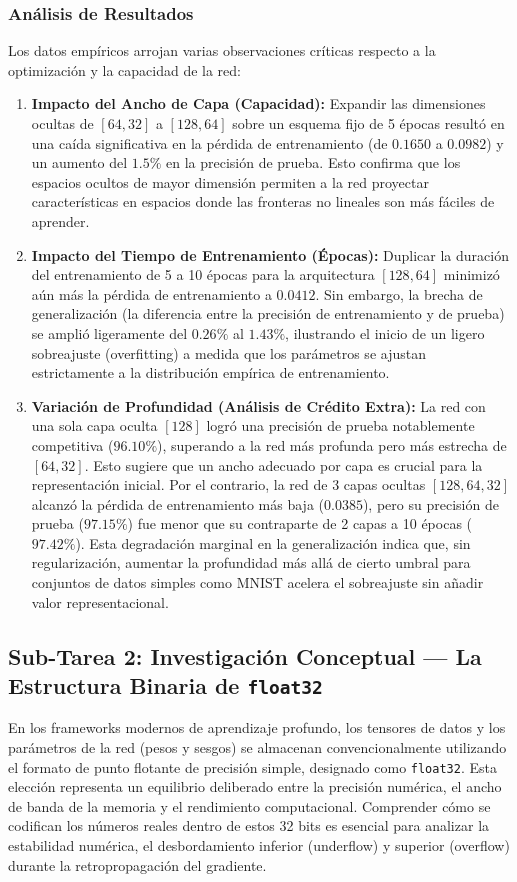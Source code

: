 \documentclass[12pt]{article}
\begin{document}
\subsubsection*{Análisis de Resultados}
Los datos empíricos arrojan varias observaciones críticas respecto a la optimización y la capacidad de la red:
\begin{enumerate}
    \item \textbf{Impacto del Ancho de Capa (Capacidad):} Expandir las dimensiones ocultas de $[64, 32]$ a $[128, 64]$ sobre un esquema fijo de 5 épocas resultó en una caída significativa en la pérdida de entrenamiento (de $0.1650$ a $0.0982$) y un aumento del $1.5\%$ en la precisión de prueba. Esto confirma que los espacios ocultos de mayor dimensión permiten a la red proyectar características en espacios donde las fronteras no lineales son más fáciles de aprender.
    \item \textbf{Impacto del Tiempo de Entrenamiento (Épocas):} Duplicar la duración del entrenamiento de 5 a 10 épocas para la arquitectura $[128, 64]$ minimizó aún más la pérdida de entrenamiento a $0.0412$. Sin embargo, la brecha de generalización (la diferencia entre la precisión de entrenamiento y de prueba) se amplió ligeramente del $0.26\%$ al $1.43\%$, ilustrando el inicio de un ligero sobreajuste (overfitting) a medida que los parámetros se ajustan estrictamente a la distribución empírica de entrenamiento.
    \item \textbf{Variación de Profundidad (Análisis de Crédito Extra):} La red con una sola capa oculta $[128]$ logró una precisión de prueba notablemente competitiva ($96.10\%$), superando a la red más profunda pero más estrecha de $[64, 32]$. Esto sugiere que un ancho adecuado por capa es crucial para la representación inicial. Por el contrario, la red de 3 capas ocultas $[128, 64, 32]$ alcanzó la pérdida de entrenamiento más baja ($0.0385$), pero su precisión de prueba ($97.15\%$) fue menor que su contraparte de 2 capas a 10 épocas ($97.42\%$). Esta degradación marginal en la generalización indica que, sin regularización, aumentar la profundidad más allá de cierto umbral para conjuntos de datos simples como MNIST acelera el sobreajuste sin añadir valor representacional.
\end{enumerate}

\newpage
\subsection*{Sub-Tarea 2: Investigación Conceptual --- La Estructura Binaria de \texttt{float32}}
En los frameworks modernos de aprendizaje profundo, los tensores de datos y los parámetros de la red (pesos y sesgos) se almacenan convencionalmente utilizando el formato de punto flotante de precisión simple, designado como \texttt{float32}. Esta elección representa un equilibrio deliberado entre la precisión numérica, el ancho de banda de la memoria y el rendimiento computacional. Comprender cómo se codifican los números reales dentro de estos 32 bits es esencial para analizar la estabilidad numérica, el desbordamiento inferior (underflow) y superior (overflow) durante la retropropagación del gradiente.
\end{document}

